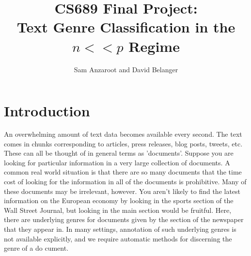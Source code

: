 \documentclass[]{article}
\begin{document}
\title{CS689 Final Project:\\ Text Genre Classification in the $n <<p$ Regime}
\author{Sam Anzaroot and David Belanger}
\maketitle
\section{Introduction}

An overwhelming amount of text data becomes available every second. The text comes in chunks corresponding to articles, press releases, blog posts, tweets, etc. These can all be thought of in general terms as 'documents'. Suppose you are looking for particular information in a very large collection of documents. A common real world situation is that there are so many documents that the time cost of looking for the information in all of the documents is prohibitive. Many of these documents may be irrelevant, however. You aren't likely to find the latest information on the European economy by looking in the sports section of the Wall Street Journal, but looking in the main section would be fruitful. Here, there are underlying genres for documents given by the section of the newspaper that they appear in. In many settings, annotation of such underlying genres is not available explicitly, and we require automatic methods for discerning the genre of a do cument. 
\end{document}
